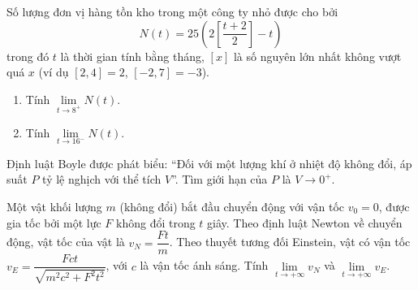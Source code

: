 \begin{bt}%
Số lượng đơn vị hàng tồn kho trong một công ty nhỏ được cho bởi
$$
N(t)=25\left(2 \left [\frac{t+2}{2}  \right ]-t\right)
$$
trong đó $t$ là thời gian tính bằng tháng, $[x]$ là số nguyên lớn nhất không vượt quá $x$ (ví dụ $[2{,}4]=2$, $[-2{,}7] = -3$).
\begin{enumerate}
\item Tính $\lim\limits_{t \to 8^+} N(t)$.
\item  Tính $\lim\limits_{t \to 16^-} N(t)$.
\end{enumerate}
\end{bt}


\begin{bt}%
Định luật Boyle được phát biểu:  ``Đối với một lượng khí ở nhiệt độ không đổi, áp suất $P$ tỷ lệ nghịch với thể tích $V$''. Tìm giới hạn của $P$ là $V \rightarrow 0^{+}$.
\end{bt}

\begin{bt}%
Một vật khối lượng $m$ (không đổi) bắt đầu chuyển động với vận tốc $v_0=0$, được gia tốc bởi một lực $F$ không đổi trong $t$ giây. Theo định luật Newton về chuyển động, vật tốc của vật là $v_N = \dfrac{Ft}{m}$. Theo thuyết tương đối Einstein, vật có vận tốc $v_E = \dfrac{Fct}{\sqrt{m^2c^2+F^2t^2}}$, với $c$ là vận tốc ánh sáng. Tính $\displaystyle \lim \limits_{t \to +\infty} v_N$ và $\displaystyle \lim \limits_{t \to +\infty} v_E$.
\end{bt}


